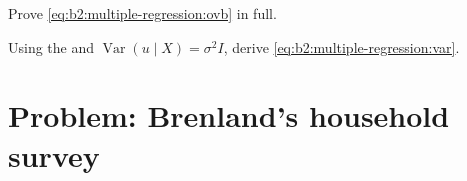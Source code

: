 \begin{exercise}[$\star\star\star$]\label{exo:b2:multiple-regression:11}
Prove \eqref{eq:b2:multiple-regression:ovb} in full.
\end{exercise}

\begin{exercise}[$\star\star\star$]\label{exo:b2:multiple-regression:12}
Using the  and $\operatorname{Var}(u \mid X) = \sigma^2I$, derive
\eqref{eq:b2:multiple-regression:var}.
\end{exercise}

\section{Problem: Brenland's household survey}\label{sec:b2:multiple-regression:problem}

